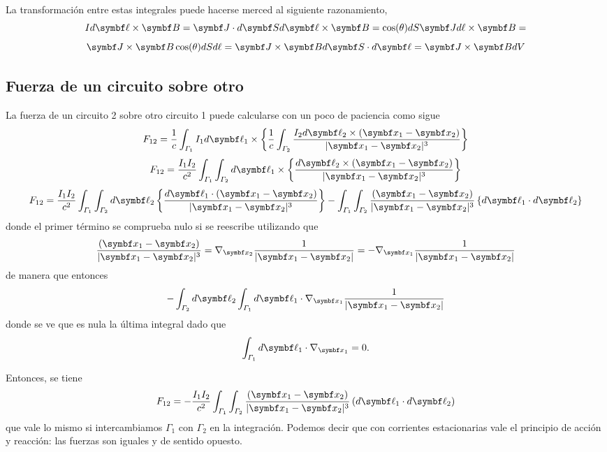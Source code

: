\documentclass[10pt,oneside]{CBFT_book}
\begin{document}
La transformación entre estas integrales puede hacerse merced al siguiente razonamiento,
\[
  	I d\vb{\ell} \times \vb{B} = \vb{J}  \cdot d\vb{S} d\vb{\ell}  \times \vb{B} =
  	\cos(\theta) dS \vb{J} d\ell \times \vb{B} = 
\]
\[
	\vb{J} \times \vb{B}  \cos(\theta) dS d\ell  = \vb{J} \times \vb{B}  d\vb{S} \cdot d\vb{\ell}  = 
	\vb{J} \times \vb{B}  dV 
\]

\subsection{Fuerza de un circuito sobre otro}

La fuerza de un circuito 2 sobre otro circuito 1 puede calcularse con un poco de paciencia como sigue
\[
	F_{12} = \frac{1}{c} \int_{\Gamma_1} I_1 d\vb{\ell}_1 \times \left\{
	\frac{1}{c} \int_{\Gamma_2} \frac{I_2 d\vb{\ell}_2 \times (\vb{x}_1 - \vb{x}_2)}{|\vb{x}_1 - \vb{x}_2|^3} 
	\right\}
\]
\[
	F_{12} = \frac{I_1 I_2}{c^2} \int_{\Gamma_1} \int_{\Gamma_2} d\vb{\ell}_1 \times \left\{
	\frac{d\vb{\ell}_2 \times (\vb{x}_1 - \vb{x}_2)}{|\vb{x}_1 - \vb{x}_2|^3} 
	\right\}
\]
\[
	F_{12} = \frac{I_1 I_2}{c^2} \int_{\Gamma_1} \int_{\Gamma_2} d\vb{\ell}_2  \left\{
	\frac{d\vb{\ell}_1 \cdot (\vb{x}_1 - \vb{x}_2)}{|\vb{x}_1 - \vb{x}_2|^3} 
	\right\} - \int_{\Gamma_1} \int_{\Gamma_2} \frac{ (\vb{x}_1 - \vb{x}_2)}{|\vb{x}_1 - \vb{x}_2|^3} 
	\left\{ d\vb{\ell}_1 \cdot d\vb{\ell}_2 \right\}
\]
donde el primer término se comprueba nulo si se reescribe utilizando que
\[
	\frac{ (\vb{x}_1 - \vb{x}_2)}{|\vb{x}_1 - \vb{x}_2|^3} = 
	\nabla_{\vb{x}_2} \frac{ 1 }{|\vb{x}_1 - \vb{x}_2|} =
	- \nabla_{\vb{x}_1} \frac{ 1 }{|\vb{x}_1 - \vb{x}_2|} 
\]
de manera que entonces
\[
	- \int_{\Gamma_2} d\vb{\ell}_2  \int_{\Gamma_1} d\vb{\ell}_1 \cdot \nabla_{\vb{x}_1} \frac{ 1 }{|\vb{x}_1 - \vb{x}_2|} 
\]
donde se ve que es nula la última integral dado que 
\[
	\int_{\Gamma_1} d\vb{\ell}_1 \cdot \nabla_{\vb{x}_1} = 0.
\]

Entonces, se tiene 
\[
	F_{12} = - \frac{I_1 I_2}{c^2} \int_{\Gamma_1} \int_{\Gamma_2} \frac{ (\vb{x}_1 - \vb{x}_2)}{|\vb{x}_1 - \vb{x}_2|^3} 
	\left( d\vb{\ell}_1 \cdot d\vb{\ell}_2 \right)
\]
que vale lo mismo si intercambiamos $\Gamma_1$ con $\Gamma_2$ en la integración. Podemos decir que con corrientes estacionarias
vale el principio de acción y reacción: las fuerzas son iguales y de sentido opuesto.
\end{document}
